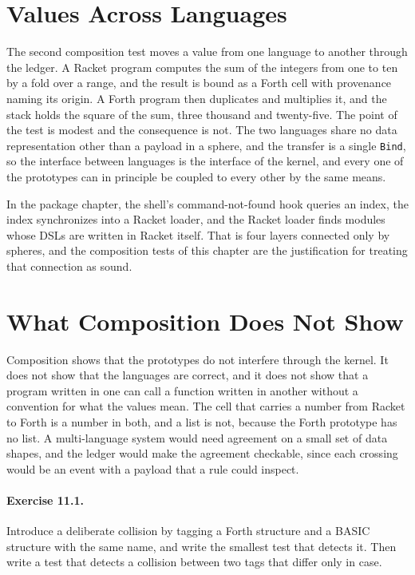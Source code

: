 \documentclass[11pt,oneside]{report}
\theoremstyle{plain}
\theoremstyle{definition}
\theoremstyle{remark}
\begin{document}
\section{Values Across Languages}

The second composition test moves a value from one language to another through the ledger. A Racket program computes the sum of the integers from one to ten by a fold over a range, and the result is bound as a Forth cell with provenance naming its origin. A Forth program then duplicates and multiplies it, and the stack holds the square of the sum, three thousand and twenty-five. The point of the test is modest and the consequence is not. The two languages share no data representation other than a payload in a sphere, and the transfer is a single \texttt{Bind}, so the interface between languages is the interface of the kernel, and every one of the prototypes can in principle be coupled to every other by the same means.

In the package chapter, the shell's command-not-found hook queries an index, the index synchronizes into a Racket loader, and the Racket loader finds modules whose DSLs are written in Racket itself. That is four layers connected only by spheres, and the composition tests of this chapter are the justification for treating that connection as sound.

\section{What Composition Does Not Show}

Composition shows that the prototypes do not interfere through the kernel. It does not show that the languages are correct, and it does not show that a program written in one can call a function written in another without a convention for what the values mean. The cell that carries a number from Racket to Forth is a number in both, and a list is not, because the Forth prototype has no list. A multi-language system would need agreement on a small set of data shapes, and the ledger would make the agreement checkable, since each crossing would be an event with a payload that a rule could inspect.

\paragraph{Exercise 11.1.} Introduce a deliberate collision by tagging a Forth structure and a BASIC structure with the same name, and write the smallest test that detects it. Then write a test that detects a collision between two tags that differ only in case.
\end{document}
